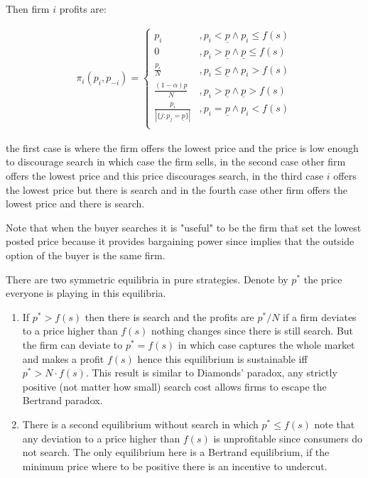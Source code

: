 \documentclass[12pt]{article}
\theoremstyle{plain}
\theoremstyle{plain}
\begin{document}
Then firm $i$ profits are: 

\begin{align}
    \pi_i(p_i, p_{-i}) = 
    \begin{cases}
        p_i &, p_i < \underline{p} \land p_i \leq f(s) \\
        0 &, p_i > \underline{p} \land \underline{p} \leq f(s) \\
        \frac{p_i}{N} &, p_i \leq \underline{p} \land p_i > f(s)\\
        \frac{(1-\alpha)\underline{p}}{N} &, p_i > \underline{p} \land \underline{p} > f(s) \\
        \frac{p_i}{|\{j: p_j =\underline{p}\}|} &, p_i = \underline{p} \land p_i < f(s)\\      
    \end{cases}
\end{align}

the first case is where the  firm offers the lowest price and the price is low enough to discourage search in which case the firm sells, in the second case other firm offers the lowest price and this price discourages search, in the third 
case $i$ offers the lowest price but there is search and in the fourth case other firm offers the lowest price and there is search. 

Note that when the buyer searches it is "useful" to be the firm that set the lowest posted price because it provides bargaining power since implies that the outside option of the buyer is the same firm.  

There are two symmetric equilibria in pure strategies. Denote by $p^*$ the price everyone is playing in this equilibria. 
\begin{enumerate}
    \item If $p^* >f(s)$ then there is search and the profits are $p^*/N$ if a firm deviates to a price higher than $f(s)$ nothing changes since there is still search. But the firm can deviate to $p^*=f(s)$ in which case captures the whole market and makes a profit $f(s)$ hence this equilibrium is sustainable iff $p^*> N \cdot f(s)$. This result is similar to Diamonds' paradox, any strictly positive (not matter how small) search cost allows firms to escape the Bertrand paradox. 
    
    \item There is a second equilibrium without search in which $p^*\leq f(s)$ note that any deviation to a price higher than $f(s)$ is unprofitable since consumers do not search. The only equilibrium here is a Bertrand equilibrium, if the minimum price where to be positive there is an incentive to undercut. 
\end{enumerate}
\end{document}
